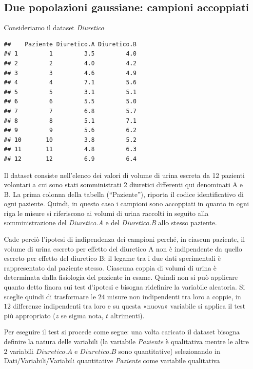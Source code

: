\documentclass[
  11pt,
]{book}
\begin{document}
\hypertarget{due-popolazioni-gaussiane-campioni-accoppiati}{%
\subsection{Due popolazioni gaussiane: campioni accoppiati}\label{due-popolazioni-gaussiane-campioni-accoppiati}}

Consideriamo il dataset \emph{Diuretico}

\begin{verbatim}
##    Paziente Diuretico.A Diuretico.B
## 1         1         3.5         4.0
## 2         2         4.0         4.2
## 3         3         4.6         4.9
## 4         4         7.1         5.6
## 5         5         3.1         5.1
## 6         6         5.5         5.0
## 7         7         6.8         5.7
## 8         8         5.1         7.1
## 9         9         5.6         6.2
## 10       10         3.8         5.2
## 11       11         4.8         6.3
## 12       12         6.9         6.4
\end{verbatim}

Il dataset consiste nell'elenco dei valori di volume di urina escreta da 12 pazienti volontari a cui sono stati somministrati 2 diuretici differenti qui denominati A e B. La prima colonna della tabella (``Paziente''), riporta il codice identificativo di ogni paziente. Quindi, in questo caso i campioni sono accoppiati in quanto in ogni riga le misure si riferiscono ai volumi di urina raccolti in seguito alla somministrazione del \emph{Diuretico.A} e del \emph{Diuretico.B} allo stesso paziente.

Cade perciò l'ipotesi di indipendenza dei campioni perché, in ciascun paziente, il volume di urina escreto per effetto del diuretico A non è indipendente da quello escreto per effetto del diuretico B: il legame tra i due dati sperimentali è rappresentato dal paziente stesso. Ciascuna coppia di volumi di urina è determinata dalla fisiologia del paziente in esame. Quindi non si può applicare quanto detto finora sui test d'ipotesi e bisogna ridefinire la variabile aleatoria.
Si sceglie quindi di trasformare le \(24\) misure non indipendenti tra loro a coppie, in \(12\) differenze indipendenti tra loro e su questa «nuova» variabile si applica il test più appropriato (\(z\) se sigma nota, \(t\) altrimenti).

Per eseguire il test si procede come segue: una volta caricato il dataset bisogna definire la natura delle variabili (la variabile \emph{Paziente} è qualitativa mentre le altre \(2\) variabili \(Diuretico.A\) e \(Diuretico.B\) sono quantitative) selezionando in Dati/Variabili/Variabili quantitative \emph{Paziente} come variabile qualitativa
\end{document}
